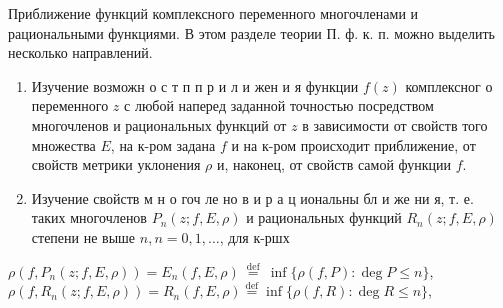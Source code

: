 \documentclass[10pt]{article}
\begin{document}
Приближение функций комплексного переменного многочленами и рациональными функциями. В этом разделе теории П. ф. к. п. можно выделить несколько направлений.



\begin{enumerate}

  \item Изучение возможн о с т п п р и л и жен и я функции $f(z)$ комплексног о переменного $z$ с любой наперед заданной точностью посредством многочленов и рациональных функций от $z$ в зависимости от свойств того множества $E$, на к-ром задана $f$ и на к-ром происходит приближение, от свойств метрики уклонения $\rho$ и, наконец, от свойств самой функции $f$.



  \item Изучение свойств м н о гоч ле но в и р а ц иональны бл и же ни я, т. е. таких многочленов $P_{n}(z ; f, E, \rho)$ и рациональных функций $R_{n}(z ; f, E, \rho)$ степени не выше $n, n=0,1, \ldots$, для к-ршх



\end{enumerate}



$\rho\left(f, P_{n}(z ; f, E, \rho)\right)=E_{n}(f, E, \rho) \stackrel{\text { def }}{=} \inf \{\rho(f, P): \operatorname{deg} P \leqslant n\}$, $\rho\left(f, R_{n}(z ; f, E, \rho)\right)=R_{n}(f, E, \rho) \stackrel{\operatorname{def}}{=} \inf \{\rho(f, R): \operatorname{deg} R \leqslant n\}$,
\end{document}
